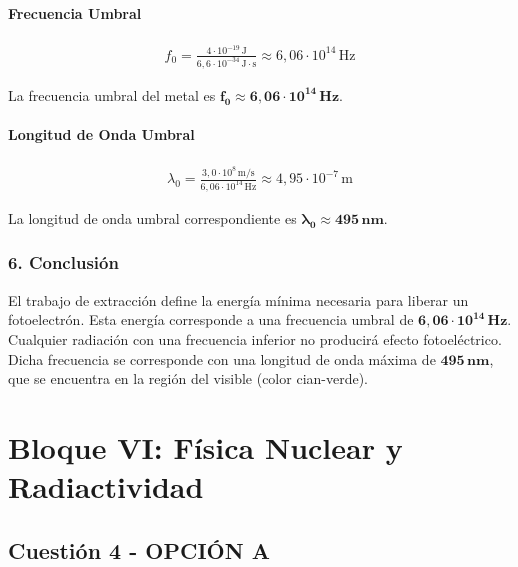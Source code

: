 \paragraph*{Frecuencia Umbral}
\begin{gather}
    f_0 = \frac{4 \cdot 10^{-19} \, \text{J}}{6,6 \cdot 10^{-34} \, \text{J}\cdot\text{s}} \approx 6,06 \cdot 10^{14} \, \text{Hz}
\end{gather}
\begin{cajaresultado}
    La frecuencia umbral del metal es $\boldsymbol{f_0 \approx 6,06 \cdot 10^{14} \, Hz}$.
\end{cajaresultado}
\paragraph*{Longitud de Onda Umbral}
\begin{gather}
    \lambda_0 = \frac{3,0 \cdot 10^8 \, \text{m/s}}{6,06 \cdot 10^{14} \, \text{Hz}} \approx 4,95 \cdot 10^{-7} \, \text{m}
\end{gather}
\begin{cajaresultado}
    La longitud de onda umbral correspondiente es $\boldsymbol{\lambda_0 \approx 495 \, nm}$.
\end{cajaresultado}

\subsubsection*{6. Conclusión}
\begin{cajaconclusion}
    El trabajo de extracción define la energía mínima necesaria para liberar un fotoelectrón. Esta energía corresponde a una frecuencia umbral de $\mathbf{6,06 \cdot 10^{14} \, Hz}$. Cualquier radiación con una frecuencia inferior no producirá efecto fotoeléctrico. Dicha frecuencia se corresponde con una longitud de onda máxima de $\mathbf{495 \, nm}$, que se encuentra en la región del visible (color cian-verde).
\end{cajaconclusion}

\newpage

\section{Bloque VI: Física Nuclear y Radiactividad}
\label{sec:nuclear_2005_sep_cv}

\subsection{Cuestión 4 - OPCIÓN A}
\label{subsec:6A_2005_sep_cv}

